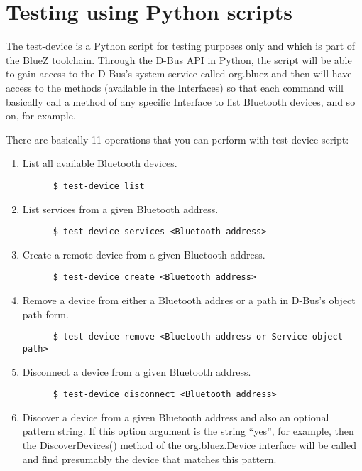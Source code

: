 \documentclass[11pt]{article}
\begin{document}
\section{Testing using Python scripts}

The test-device is a Python script for testing purposes only and which is part
of the BlueZ toolchain. Through the D-Bus API in Python, the script
will be able to gain access to the D-Bus's system service called
org.bluez and then will have access to the methods (available in the
Interfaces) so that each command will basically call a method of any
specific Interface to list Bluetooth devices, and so on, for example.

There are basically 11 operations that you can perform with test-device script:
\begin{enumerate}
  \item List all available Bluetooth devices.
    \begin{verbatim}
      $ test-device list
    \end{verbatim}
  \item List services from a given Bluetooth address.
    \begin{verbatim}
      $ test-device services <Bluetooth address>
    \end{verbatim}
  \item Create a remote device from a given Bluetooth address.
    \begin{verbatim}
      $ test-device create <Bluetooth address>
    \end{verbatim}
  \item Remove a device from either a Bluetooth addres or a path in
        D-Bus's object path form.
    \begin{verbatim}
      $ test-device remove <Bluetooth address or Service object path>
    \end{verbatim}
  \item Disconnect a device from a given Bluetooth address.
    \begin{verbatim}
      $ test-device disconnect <Bluetooth address>
    \end{verbatim}
  \item Discover a device from a given Bluetooth address and also an
        optional pattern string. If this option argument is the string
        ``yes'', for example, then the DiscoverDevices() method of the
        org.bluez.Device interface will be called and find presumably
        the device that matches this pattern.
    \begin{verbatim}

\end{verbatim}
\end{enumerate}
\end{document}
